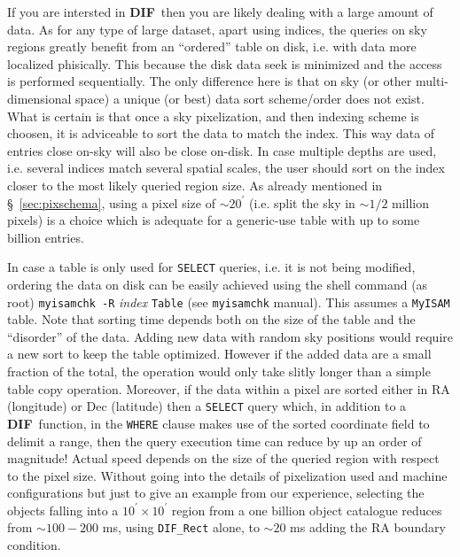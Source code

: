 \documentclass[10pt,titlepage]{article}
\newcommand{\dif}{\textbf{\small DIF}}
\begin{document}
\smallskip
If you are intersted in \dif\ then you are likely dealing with a large
amount of data. As for any type of large dataset, apart using indices,
the queries on sky
regions greatly benefit from an ``ordered'' table on disk, i.e. with
data more localized phisically. This because the
disk data seek is minimized and the access is performed sequentially.
The only difference here is that on sky (or other multi-dimensional space)
a unique (or best) data sort scheme/order does not exist.
What is certain is that once
a sky pixelization, and then indexing scheme is choosen, it is adviceable
to sort the data to match the index. This way data of entries close on-sky
will also be close on-disk. In case multiple depths are used,
i.e. several indices match several spatial scales, the user should sort on
the index closer to the most likely queried region size.
As already mentioned in \S\ \ref{sec:pixschema}, using a pixel size of
$\sim 20^\prime$ (i.e. split the sky in $\sim 1/2$ million pixels) is a
choice which is adequate for a generic-use table with up to
some billion entries.

In case a table is only used for \verb|SELECT| queries, i.e. it is not
being modified, ordering the data on disk can be easily achieved using the
shell command (as root) \verb|myisamchk -R| \textit{index} {\tt Table}
(see \verb|myisamchk| manual). This assumes a \verb|MyISAM| table.
Note that sorting time depends both on the size of the table and the
``disorder'' of the data. Adding new data with random sky positions would
require a new sort to keep the table optimized. However if the added data
are a small fraction of the total, the operation would only take slitly longer
than a simple table copy operation.
Moreover, if the data within a pixel are sorted either in RA (longitude) or
Dec (latitude) then a \verb|SELECT| query which, in addition to a \dif\
function, in the \verb|WHERE| clause makes use of the sorted coordinate field
to delimit a range, then the query execution time can reduce by up an
order of magnitude! Actual speed depends on the size of the queried region
with respect to the pixel size. Without going into the details of pixelization
used and machine configurations but just to give an example from our
experience, selecting the objects falling into a $10^\prime\times10^\prime$
region from a one billion object catalogue reduces from $\sim 100-200$ ms,
using \verb|DIF_Rect| alone, to $\sim 20$ ms adding the RA boundary condition.
\end{document}
